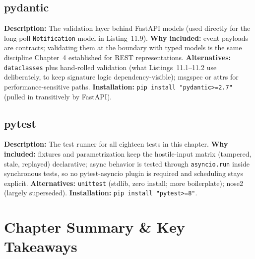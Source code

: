 \subsection{pydantic}
\textbf{Description:} The validation layer behind FastAPI models (used
directly for the long-poll \texttt{Notification} model in Listing~11.9).
\textbf{Why included:} event payloads are contracts; validating them at the
boundary with typed models is the same discipline Chapter~4 established for
REST representations.
\textbf{Alternatives:} \texttt{dataclasses} plus hand-rolled validation
(what Listings~11.1--11.2 use deliberately, to keep signature logic
dependency-visible); msgspec or attrs for performance-sensitive paths.
\textbf{Installation:} \texttt{pip install "pydantic>=2.7"} (pulled in
transitively by FastAPI).

\subsection{pytest}
\textbf{Description:} The test runner for all eighteen tests in this
chapter.
\textbf{Why included:} fixtures and parametrization keep the hostile-input
matrix (tampered, stale, replayed) declarative; async behavior is tested
through \texttt{asyncio.run} inside synchronous tests, so no pytest-asyncio
plugin is required and scheduling stays explicit.
\textbf{Alternatives:} \texttt{unittest} (stdlib, zero install; more
boilerplate); nose2 (largely superseded).
\textbf{Installation:} \texttt{pip install "pytest>=8"}.

\section{Chapter Summary \& Key Takeaways}
\label{sec:ch11-summary}


